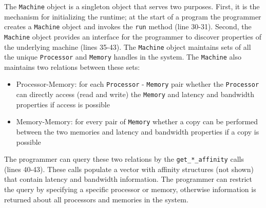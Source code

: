 The {\tt Machine} object is a singleton object that serves two purposes.  First, it
is the mechanism for initializing the runtime; at the start of a program the programmer
creates a {\tt Machine} object and invokes the {\tt run} method (line 30-31).
Second, the {\tt Machine} object provides an interface for the programmer to 
discover properties of the underlying machine (lines 35-43).  The {\tt Machine} object maintains
sets of all the unique {\tt Processor} and {\tt Memory} handles in the system.
The {\tt Machine} also maintains two relations between these sets:

\begin{itemize}
\item Processor-Memory: for each {\tt Processor} - {\tt Memory} pair whether
the {\tt Processor} can directly access (read and write) the {\tt Memory} and 
latency and bandwidth properties if access is possible
\item Memory-Memory: for every pair of {\tt Memory} whether a copy can be
performed between the two memories and latency and
bandwidth properties if a copy is possible
\end{itemize}

The programmer can query these two relations by the {\tt get\_*\_affinity} calls
(lines 40-43).  These calls populate a vector with affinity structures (not shown)
that contain latency and bandwidth information.  The programmer can restrict the query
by specifying a specific processor or memory, otherwise information is returned
about all processors and memories in the system.  

